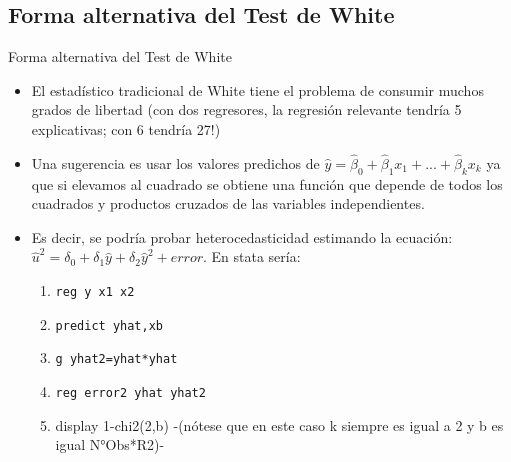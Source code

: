 \subsection{Forma alternativa del Test de White}

\begin{frame}{Forma alternativa del Test de White}
	\begin{itemize}
		\item El estadístico tradicional de White tiene el problema de consumir muchos grados de libertad (con dos regresores, la regresión relevante tendría 5 explicativas; con 6 tendría 27!)
		\pause
		\item Una sugerencia es usar los valores predichos de $\hat{y}=\hat{\beta}_{0}+\hat{\beta}_{1}x_{1}+...+\hat{\beta}_{k}x_{k}$ ya que si elevamos al cuadrado se obtiene una función que depende de todos los cuadrados y productos cruzados de las variables independientes.
		\pause
		\item Es decir, se podría probar heterocedasticidad estimando la ecuación: $\hat{u}^2=\delta_{0}+\delta_{1}\hat{y}+\delta_{2}\hat{y}^2+error$. En stata sería:
		\pause
			\begin{enumerate}
				\item \colorbox{codegray}{\texttt{\textcolor{codeblue}{reg} y x1 x2}}
				\item \colorbox{codegray}{\texttt{\textcolor{codeblue}{predict} yhat,xb}}
				\item \colorbox{codegray}{\texttt{\textcolor{codeblue}{g} yhat2=yhat*yhat}}
				\item \colorbox{codegray}{\texttt{\textcolor{codeblue}{reg} error2 yhat yhat2}}
				\item display 1-chi2(2,b) -(nótese que en este caso k siempre es igual a 2 y b es igual N°Obs*R2)-
			\end{enumerate}
	\end{itemize}
\end{frame}
